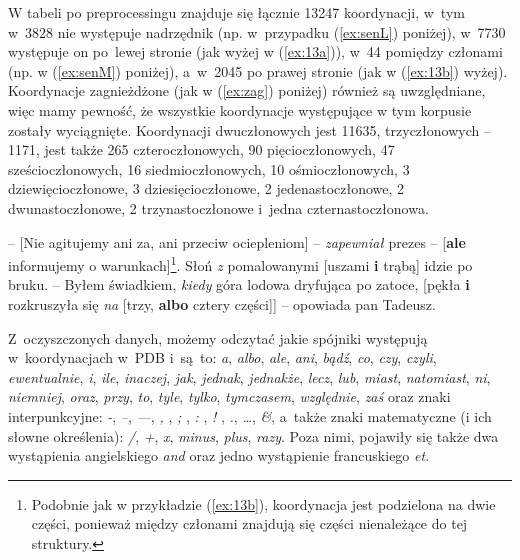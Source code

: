 \documentclass[licencjacka]{pracamgr_Kogni}
\begin{document}
    W tabeli po preprocessingu znajduje się łącznie 13247 koordynacji, w~tym w~3828 nie występuje nadrzędnik (np. w~przypadku (\ref{ex:senL}) poniżej), w~7730 występuje on po~lewej stronie (jak wyżej w (\ref{ex:13a})), w~44 pomiędzy członami (np. w (\ref{ex:senM}) poniżej), a~w~2045 po prawej stronie (jak w (\ref{ex:13b}) wyżej).
    Koordynacje zagnieżdżone (jak w (\ref{ex:zag}) poniżej) również są uwzględniane, więc mamy pewność, że wszystkie koordynacje występujące w tym korpusie zostały wyciągnięte.
    Koordynacji dwuczłonowych jest 11635, trzyczłonowych -- 1171, jest także 265 czteroczłonowych, 90 pięcioczłonowych, 47 sześcioczłonowych, 16 siedmioczłonowych, 10 ośmioczłonowych, 3 dziewięcioczłonowe, 3 dziesięcioczłonowe, 2 jedenastoczłonowe, 2 dwunastoczłonowe, 2 trzynastoczłonowe i~jedna czternastoczłonowa.
    \begin{exe}
        \ex
        {– [Nie agitujemy ani za, ani przeciw ociepleniom] – \textit{zapewniał} prezes – [\textbf{ale} informujemy o warunkach]\footnote{Podobnie jak w przykładzie (\ref{ex:13b}), koordynacja jest podzielona na dwie części, ponieważ między członami znajdują się części nienależące do tej struktury.}.
            \label{ex:senM}}
        \ex
        Słoń \textit{z} pomalowanymi [uszami \textbf{i} trąbą] idzie po bruku.
            \label{ex:senL}
        \ex
        – Byłem świadkiem, \textit{kiedy} góra lodowa dryfująca po zatoce, [pękła \textbf{i} rozkruszyła się \textit{na} [trzy, \textbf{albo} cztery części]] – opowiada pan Tadeusz.
            \label{ex:zag}
    \end{exe}

    Z~oczyszczonych danych, możemy odczytać jakie spójniki występują w~koordynacjach w~PDB i~są~to: \textit{a}, \textit{albo}, \textit{ale}, \textit{ani}, \textit{bądź}, \textit{co}, \textit{czy}, \textit{czyli}, \textit{ewentualnie}, \textit{i}, \textit{ile}, \textit{inaczej}, \textit{jak}, \textit{jednak}, \textit{jednakże}, \textit{lecz}, \textit{lub}, \textit{miast},  \textit{natomiast}, \textit{ni}, \textit{niemniej}, \textit{oraz}, \textit{przy}, \textit{to}, \textit{tyle}, \textit{tylko}, \textit{tymczasem}, \textit{względnie}, \textit{zaś} oraz znaki interpunkcyjne: \textit{-}, \textit{--}, \textit{---}, \textit{, }, \textit{; }, \textit{: }, \textit{! }, \textit{.}, \textit{…}, \textit{\&}, a~także znaki matematyczne (i ich słowne określenia): \textit{/}, \textit{+}, \textit{x}, \textit{minus}, \textit{plus}, \textit{razy}.
    Poza nimi, pojawiły się także dwa wystąpienia angielskiego \textit{and} oraz jedno wystąpienie francuskiego \textit{et}.
\end{document}
